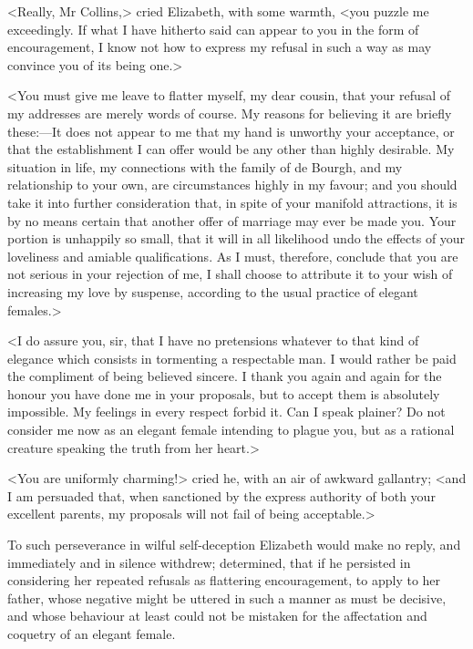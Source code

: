 <Really, Mr Collins,> cried Elizabeth, with some warmth, <you puzzle me exceedingly. If what I have hitherto said can appear to you in the form of encouragement, I know not how to express my refusal in such a way as may convince you of its being one.>

<You must give me leave to flatter myself, my dear cousin, that your refusal of my addresses are merely words of course. My reasons for believing it are briefly these:—It does not appear to me that my hand is unworthy your acceptance, or that the establishment I can offer would be any other than highly desirable. My situation in life, my connections with the family of de Bourgh, and my relationship to your own, are circumstances highly in my favour; and you should take it into further consideration that, in spite of your manifold attractions, it is by no means certain that another offer of marriage may ever be made you. Your portion is unhappily so small, that it will in all likelihood undo the effects of your loveliness and amiable qualifications. As I must, therefore, conclude that you are not serious in your rejection of me, I shall choose to attribute it to your wish of increasing my love by suspense, according to the usual practice of elegant females.>

<I do assure you, sir, that I have no pretensions whatever to that kind of elegance which consists in tormenting a respectable man. I would rather be paid the compliment of being believed sincere. I thank you again and again for the honour you have done me in your proposals, but to accept them is absolutely impossible. My feelings in every respect forbid it. Can I speak plainer? Do not consider me now as an elegant female intending to plague you, but as a rational creature speaking the truth from her heart.>

<You are uniformly charming!> cried he, with an air of awkward gallantry; <and I am persuaded that, when sanctioned by the express authority of both your excellent parents, my proposals will not fail of being acceptable.>

To such perseverance in wilful self-deception Elizabeth would make no reply, and immediately and in silence withdrew; determined, that if he persisted in considering her repeated refusals as flattering encouragement, to apply to her father, whose negative might be uttered in such a manner as must be decisive, and whose behaviour at least could not be mistaken for the affectation and coquetry of an elegant female.
